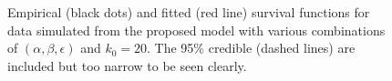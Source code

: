 \documentclass[
  sn-basic,
  10pt,
]{sn-jnl}
\theoremstyle{plain}
\theoremstyle{plain}
\theoremstyle{remark}
\begin{document}
\begin{figure}


\caption{\label{fig-rec1}Empirical (black dots) and fitted (red line)
survival functions for data simulated from the proposed model with
various combinations of \((\alpha,\beta,\epsilon)\) and \(k_0=20\). The
95\% credible (dashed lines) are included but too narrow to be seen
clearly.}

\end{figure}%
\end{document}
